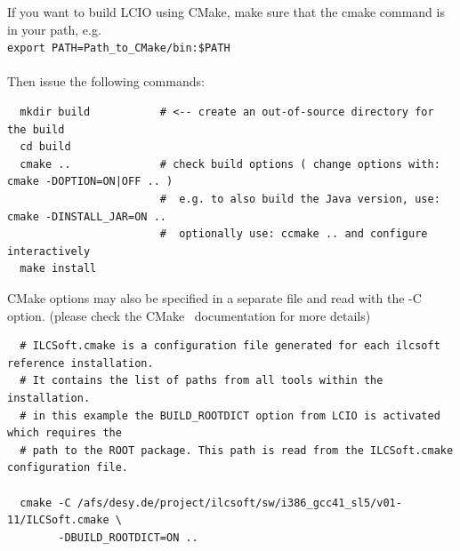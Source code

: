\documentclass[twoside]{article}
\begin{document}
If you want to build LCIO using CMake, make sure that the cmake command is in your path, e.g.\\

\verb|export PATH=Path_to_CMake/bin:$PATH|\\\\

Then issue the following commands:
\begin{verbatim}
  mkdir build           # <-- create an out-of-source directory for the build
  cd build
  cmake ..              # check build options ( change options with: cmake -DOPTION=ON|OFF .. )
                        #  e.g. to also build the Java version, use: cmake -DINSTALL_JAR=ON ..
                        #  optionally use: ccmake .. and configure interactively
  make install
\end{verbatim}

CMake options may also be specified in a separate file and read with the -C option. (please check the CMake~\cite{ref_cmake} documentation for more details)
\begin{verbatim}
  # ILCSoft.cmake is a configuration file generated for each ilcsoft reference installation.
  # It contains the list of paths from all tools within the installation.
  # in this example the BUILD_ROOTDICT option from LCIO is activated which requires the 
  # path to the ROOT package. This path is read from the ILCSoft.cmake configuration file.

  cmake -C /afs/desy.de/project/ilcsoft/sw/i386_gcc41_sl5/v01-11/ILCSoft.cmake \
        -DBUILD_ROOTDICT=ON ..

\end{verbatim}

\end{document}

